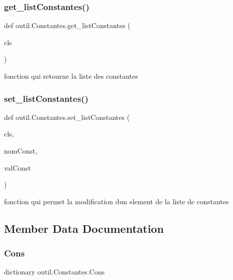 \subsubsection{\texorpdfstring{get\+\_\+list\+Constantes()}{get\_listConstantes()}}
{\footnotesize\ttfamily def outil.\+Constantes.\+get\+\_\+list\+Constantes (\begin{DoxyParamCaption}\item[{}]{cls }\end{DoxyParamCaption})}



fonction qui retourne la liste des constantes 

\mbox{\label{classoutil_1_1_constantes_af35fe7ebb9df8350160593eeb2436849}} 
\subsubsection{\texorpdfstring{set\+\_\+list\+Constantes()}{set\_listConstantes()}}
{\footnotesize\ttfamily def outil.\+Constantes.\+set\+\_\+list\+Constantes (\begin{DoxyParamCaption}\item[{}]{cls,  }\item[{}]{nom\+Const,  }\item[{}]{val\+Const }\end{DoxyParamCaption})}



fonction qui permet la modification d\textquotesingle{}un element de la liste de constantes 



\subsection{Member Data Documentation}
\mbox{\label{classoutil_1_1_constantes_acff4386578b87455388730ad468cbe64}} 
\subsubsection{\texorpdfstring{Cons}{Cons}}
{\footnotesize\ttfamily dictionary outil.\+Constantes.\+Cons\hspace{0.3cm}{\ttfamily [static]}}

